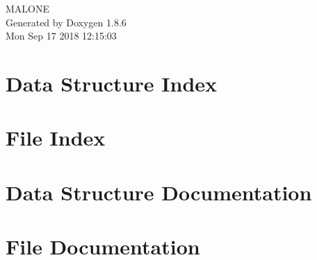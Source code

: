 \documentclass[twoside]{book}
\newcommand{\clearemptydoublepage}{%
  \newpage{\pagestyle{empty}\cleardoublepage}%
}
\begin{document}
\hypersetup{pageanchor=false}
\begin{titlepage}
\vspace*{7cm}
\begin{center}%
{\Large M\-A\-L\-O\-N\-E }\\
\vspace*{1cm}
{\large Generated by Doxygen 1.8.6}\\
\vspace*{0.5cm}
{\small Mon Sep 17 2018 12:15:03}\\
\end{center}
\end{titlepage}
\clearemptydoublepage
\tableofcontents
\clearemptydoublepage
{}
\hypersetup{pageanchor=true}

\chapter{Data Structure Index}

\chapter{File Index}

\chapter{Data Structure Documentation}















\chapter{File Documentation}













































\newpage
{}
{}
\printindex
\end{document}

